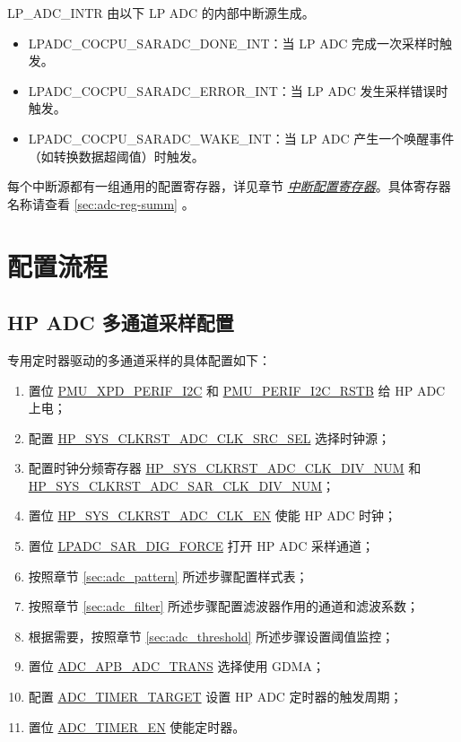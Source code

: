 \documentclass[main\_\_CN.tex]{subfiles}
\begin{document}
LP\_ADC\_INTR 由以下 LP ADC 的内部中断源生成。

\begin{itemize}
   \item \label{interreupt:LPADCCOCPUSARADCxINT} LPADC\_COCPU\_SARADC\_DONE\_INT：当 LP ADC 完成一次采样时触发。
   \item \label{interreupt:LPADCCOCPUSARADCxERRORINT} LPADC\_COCPU\_SARADC\_ERROR\_INT：当 LP ADC 发生采样错误时触发。
   \item \label{interreupt:LPADCCOCPUSARADCxWAKEINT} LPADC\_COCPU\_SARADC\_WAKE\_INT：当 LP ADC 产生一个唤醒事件（如转换数据超阈值）时触发。
\end{itemize}

每个中断源都有一组通用的配置寄存器，详见章节 \hyperref[interrupt-config-registers]{\textit{中断配置寄存器}}。具体寄存器名称请查看 \ref{sec:adc-reg-summ} \textit{}。

\section{配置流程}
\subsection{HP ADC 多通道采样配置}

专用定时器驱动的多通道采样的具体配置如下：
\begin{enumerate}
    \item 置位 \hyperref[fielddesc:PMUXPDPERIFI2C]{PMU\_XPD\_PERIF\_I2C} 和 \hyperref[fielddesc:PMUPERIFI2CRSTB]{PMU\_PERIF\_I2C\_RSTB} 给 HP ADC 上电；
    \item 配置 \hyperref[fielddesc:HPSYSCLKRSTADCCLKSRCSEL]{HP\_SYS\_CLKRST\_ADC\_CLK\_SRC\_SEL} 选择时钟源；
    \item 配置时钟分频寄存器 \hyperref[fielddesc:HPSYSCLKRSTADCCLKDIVNUM]{HP\_SYS\_CLKRST\_ADC\_CLK\_DIV\_NUM} 和 \hyperref[fielddesc:HPSYSCLKRSTADCSAR1CLKDIVNUM]{HP\_SYS\_CLKRST\_ADC\_SAR\_CLK\_DIV\_NUM}；
    \item 置位 \hyperref[fielddesc:HPSYSCLKRSTADCCLKEN]{HP\_SYS\_CLKRST\_ADC\_CLK\_EN} 使能 HP ADC 时钟；
    \item 置位 \hyperref[fielddesc:LPADCSAR1DIGFORCE]{LPADC\_SAR\_DIG\_FORCE} 打开 HP ADC 采样通道；
    \item 按照章节 \ref{sec:adc_pattern} \textit{} 所述步骤配置样式表；
    \item 按照章节 \ref{sec:adc_filter} \textit{} 所述步骤配置滤波器作用的通道和滤波系数；
    \item 根据需要，按照章节 \ref{sec:adc_threshold} \textit{} 所述步骤设置阈值监控；
    \item 置位 \hyperref[fielddesc:ADCAPBADCTRANS]{ADC\_APB\_ADC\_TRANS} 选择使用 GDMA；
    \item 配置 \hyperref[fielddesc:ADCTIMERTARGET]{ADC\_TIMER\_TARGET} 设置 HP ADC 定时器的触发周期；
    \item 置位 \hyperref[fielddesc:ADCTIMEREN]{ADC\_TIMER\_EN} 使能定时器。
\end{enumerate}
\end{document}
